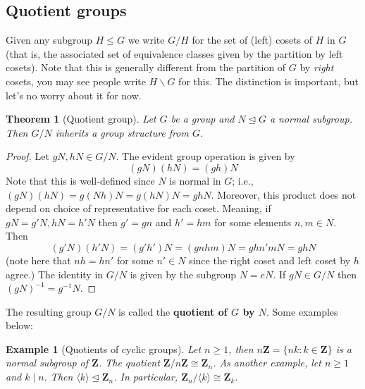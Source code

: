 \documentclass[12pt]{article}
\numberwithin{equation}{subsection}
\newtheorem{thm}[subsection]{Theorem}
\theoremstyle{note}
\newtheorem{example}[subsection]{Example}
\newcommand{\nrml}{\trianglelefteq}
\begin{document}
\subsection{Quotient groups} 
Given any subgroup $H\leq G$ we write $G/H$ for the set of (left) cosets of $H$ in $G$ (that is, the associated set of equivalence classes given by the partition by left cosets). Note that this is generally different from the partition of $G$ by \textit{right} cosets, you may see people write $H\backslash G$ for this. The distinction is important, but let's no worry about it for now.


\begin{thm}[Quotient group]
	Let $G$ be a group and $N\nrml G$ a normal subgroup. Then $G/N$ inherits a group structure from $G$. 
\end{thm}


\begin{proof}
Let $gN,hN\in G/N$. The evident group operation is given by \[ (gN)(hN)=(gh)N\] Note that this is well-defined since $N$ is normal in $G$; i.e., $(gN)(hN)=g(Nh)N=g(hN)N=ghN$. Moreover, this product does not depend on choice of representative for each coset. Meaning, if $gN=g'N, hN=h'N$ then $g'=gn$ and $h'=hm$ for some elements $n,m\in N$. Then \[(g'N)(h'N)=(g'h')N=(gnhm)N=ghn'mN=ghN\] (note here that $nh=hn'$ for some $n'\in N$ since the right coset and left coset by $h$ agree.) The identity in $G/N$ is given by the subgroup $N=eN$. If $gN\in G/N$ then $(gN)^{-1}=g^{-1}N$. 
\end{proof}

The resulting group $G/N$ is called the \textbf{quotient of $G$ by $N$}. Some examples below:

\begin{example}[Quotients of cyclic groups]
	 Let $n\geq1$, then $n\mathbf{Z}=\{nk:k\in \mathbf{Z}\}$ is a normal subgroup of $\mathbf{Z}$. The quotient $\mathbf{Z}/n\mathbf{Z}\cong \mathbf{Z}_n$.
	As another example, let $n\geq 1$ and $k\mid n$. Then $\langle k\rangle\nrml \mathbf{Z}_n$. In particular, $\mathbf{Z}_n/\langle k\rangle \cong \mathbf{Z}_k$.
\end{example}
\end{document}
